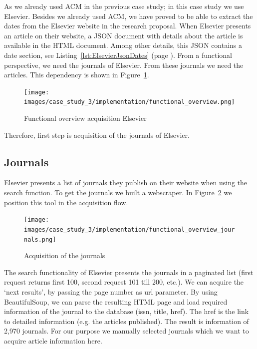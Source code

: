 \documentclass{ou-report}
\begin{document}
As we already used ACM in the previous case study; in this case study we
use Elsevier. Besides we already used ACM, we have proved to be able to extract
the dates from the Elsevier website in the research proposal.
When Elsevier presents an article on their website, a JSON 
document with details about the article is available in the HTML document. Among
other details, this JSON contains a date section, see 
Listing~\ref{lst:ElsevierJsonDates} (page \pageref{lst:ElsevierJsonDates}).
From a functional perspective, we need the journals of Elsevier. From these journals
we need the articles. This dependency is shown in
Figure~\ref{fig:functional_overview_elsevier}.

\begin{figure}[H]
\centering
\texttt{[image: images/case\_study\_3/implementation/functional\_overview.png]}
\caption{Functional overview acquisition Elsevier}
\label{fig:functional_overview_elsevier}
\end{figure}

Therefore, first step is acquisition of the journals of Elsevier.
\subsection{Journals}
Elsevier presents a list of journals they publish on their website when using
the search function. To get the journals we built a webscraper. In
Figure~\ref{fig:functional_overview_elsevier_journals} we position this tool in
the acquisition flow.

\begin{figure}[H]
\centering
\texttt{[image: images/case\_study\_3/implementation/functional\_overview\_journals.png]}
\caption{Acquisition of the journals}
\label{fig:functional_overview_elsevier_journals}
\end{figure}

The search functionality of Elsevier presents the journals in a paginated list
(first request returns first 100, second request 101 till 200, etc.). We can
acquire the `next results', by passing the page number as url parameter. By
using BeautifulSoup, we can parse the resulting HTML page and load required
information of the journal to the database (issn, title, href). The href is the
link to detailed information (e.g. the articles published).
The result is information of 2,970 journals. For our purpose we manually 
selected journals which we want to acquire article information here.
\end{document}
